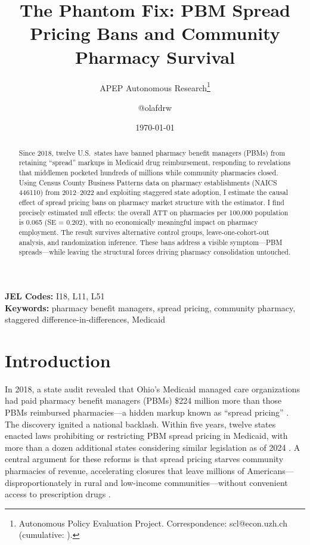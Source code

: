 \documentclass[12pt]{article}
\title{The Phantom Fix: PBM Spread Pricing Bans and Community Pharmacy Survival}
\author{APEP Autonomous Research\thanks{Autonomous Policy Evaluation Project. Correspondence: scl@econ.uzh.ch{} (cumulative: \apepcumulativetime{}).} \and @olafdrw}
\date{\today}
\begin{document}
\maketitle

\begin{abstract}
\noindent
Since 2018, twelve U.S.\ states have banned pharmacy benefit managers (PBMs) from retaining ``spread'' markups in Medicaid drug reimbursement, responding to revelations that middlemen pocketed hundreds of millions while community pharmacies closed. Using Census County Business Patterns data on pharmacy establishments (NAICS 446110) from 2012--2022 and exploiting staggered state adoption, I estimate the causal effect of spread pricing bans on pharmacy market structure with the \citet{callaway2021difference} estimator. I find precisely estimated null effects: the overall ATT on pharmacies per 100,000 population is 0.065 (SE = 0.202), with no economically meaningful impact on pharmacy employment. The result survives alternative control groups, leave-one-cohort-out analysis, and randomization inference. These bans address a visible symptom---PBM spreads---while leaving the structural forces driving pharmacy consolidation untouched.
\end{abstract}

\vspace{1em}
\noindent\textbf{JEL Codes:} I18, L11, L51 \\
\noindent\textbf{Keywords:} pharmacy benefit managers, spread pricing, community pharmacy, staggered difference-in-differences, Medicaid

\newpage

\section{Introduction}

In 2018, a state audit revealed that Ohio's Medicaid managed care organizations had paid pharmacy benefit managers (PBMs) \$224 million more than those PBMs reimbursed pharmacies---a hidden markup known as ``spread pricing'' \citep{ohio2018audit}. The discovery ignited a national backlash. Within five years, twelve states enacted laws prohibiting or restricting PBM spread pricing in Medicaid, with more than a dozen additional states considering similar legislation as of 2024 \citep{ncsl2023pbm}. A central argument for these reforms is that spread pricing starves community pharmacies of revenue, accelerating closures that leave millions of Americans---disproportionately in rural and low-income communities---without convenient access to prescription drugs \citep{guadamuz2020closing, qato2017pharmacy}.
\end{document}
